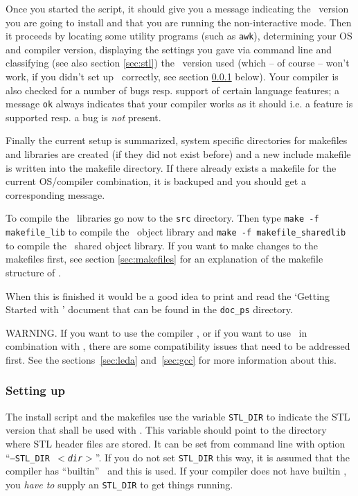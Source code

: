 Once you started the script, it should give you a message indicating
the \cgal\ version you are going to install and that you are running
the non-interactive mode. Then it proceeds by locating some utility
programs (such as {\tt awk}), determining your OS and compiler
version, displaying the settings you gave via command line and
classifying (see also section \ref{sec:stl}) the \stl\ version used
(which -- of course -- won't work, if you didn't set up \stl\ 
correctly, see section \ref{sec:stl-setup} below). Your compiler is
also checked for a number of bugs resp. support of certain language
features; a message {\tt ok} always indicates that your compiler works
as it should i.e. a feature is supported resp. a bug is {\it not}
present.

Finally the current setup is summarized, system specific directories
for makefiles and libraries are created (if they did not exist before)
and a new include makefile is written into the makefile directory. If
there already exists a makefile for the current OS/compiler
combination, it is backuped and you should get a corresponding
message.

To compile the \cgal\ libraries go now to the \texttt{src} directory.
Then type \texttt{make -f makefile\_lib} to compile the \cgal\ object
library and \texttt{make -f makefile\_sharedlib} to compile the \cgal\ 
shared object library. If you want to make changes to the makefiles
first, see section \ref{sec:makefiles} for an explanation of the
makefile structure of \cgal.

When this is finished it would be a good idea to print and read the
`Getting Started with \cgal' document that can be found in the
\texttt{doc\_ps} directory.

WARNING.  If you want to use the compiler , or if you want to
use \leda\ in combination with \cgal, there are some compatibility
issues that need to be addressed first.  See the
sections~\ref{sec:leda} and~\ref{sec:gcc} for more information about
this.

\subsubsection{Setting up \stl}\label{sec:stl-setup}

The install script and the makefiles use the variable {\tt STL\_DIR}
to indicate the STL version that shall be used with \cgal. This
variable should point to the directory where STL header files are
stored. It can be set from command line with option ``{\tt --STL\_DIR
  {\it $<$dir$>$}}''. If you do not set {\tt STL\_DIR} this way, it is
assumed that the compiler has ``builtin'' \stl\ and this is used. If
your compiler does not have builtin \stl, you {\it have to} supply an
{\tt STL\_DIR} to get things running.

